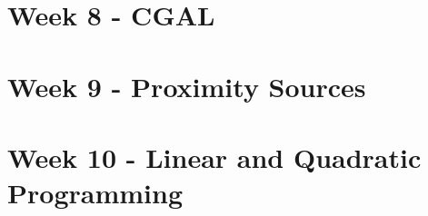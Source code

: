 \documentclass[a4paper,titlepage]{article}
\begin{document}
\newpage
\part{Week 8 - CGAL}







\newpage
\part{Week 9 - Proximity Sources}









\newpage
\part{Week 10 - Linear and Quadratic Programming}








%
%
%
%
%
\end{document}
